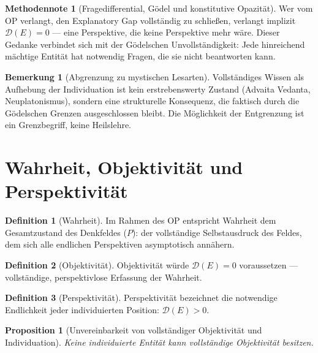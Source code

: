 \documentclass[11pt,a4paper]{article}
\theoremstyle{plain}
\newtheorem{proposition}{Proposition}[section]
\theoremstyle{definition}
\newtheorem{definition}{Definition}[section]
\newtheorem{remark}{Bemerkung}[section]
\newtheorem{methodennote}{Methodennote}[section]
\begin{document}
\begin{methodennote}[Fragedifferential, G\"{o}del und konstitutive Opazit\"{a}t]
Wer vom OP verlangt, den Explanatory Gap vollst\"{a}ndig zu schlie\ss{}en, verlangt
implizit $\mathcal{D}(E) = 0$ --- eine Perspektive, die keine Perspektive mehr w\"{a}re.
Dieser Gedanke verbindet sich mit der G\"{o}delschen Unvollst\"{a}ndigkeit: Jede
hinreichend m\"{a}chtige Entit\"{a}t hat notwendig Fragen, die sie nicht beantworten kann.

\begin{remark}[Abgrenzung zu mystischen Lesarten]
Vollst\"{a}ndiges Wissen als Aufhebung der Individuation ist kein erstrebenswerty Zustand
(Advaita Vedanta, Neuplatonismus), sondern eine strukturelle Konsequenz, die faktisch
durch die G\"{o}delschen Grenzen ausgeschlossen bleibt. Die M\"{o}glichkeit der
Entgrenzung ist ein Grenzbegriff, keine Heilslehre.
\end{remark}
\end{methodennote}

\section{Wahrheit, Objektivit\"{a}t und Perspektivit\"{a}t}

\begin{definition}[Wahrheit]
Im Rahmen des OP entspricht Wahrheit dem Gesamtzustand des Denkfeldes ($P$): der
vollst\"{a}ndige Selbstausdruck des Feldes, dem sich alle endlichen Perspektiven
asymptotisch ann\"{a}hern.
\end{definition}

\begin{definition}[Objektivit\"{a}t]
Objektivit\"{a}t w\"{u}rde $\mathcal{D}(E) = 0$ voraussetzen --- vollst\"{a}ndige,
perspektivlose Erfassung der Wahrheit.
\end{definition}

\begin{definition}[Perspektivit\"{a}t]
Perspektivit\"{a}t bezeichnet die notwendige Endlichkeit jeder individuierten Position:
$\mathcal{D}(E) > 0$.
\end{definition}

\begin{proposition}[Unvereinbarkeit von vollst\"{a}ndiger Objektivit\"{a}t und Individuation]
Keine individuierte Entit\"{a}t kann vollst\"{a}ndige Objektivit\"{a}t besitzen.
\end{proposition}
\end{document}
